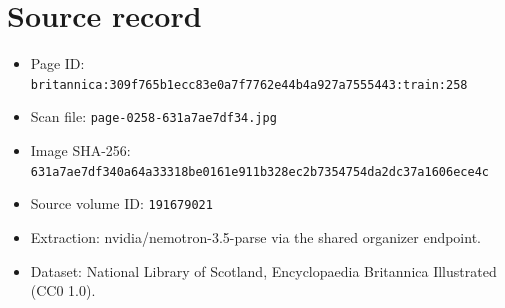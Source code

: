 \documentclass{article}
\begin{document}
\section*{Source record}
\begin{itemize}
\item Page ID: \texttt{britannica:309f765b1ecc83e0a7f7762e44b4a927a7555443:train:258}
\item Scan file: \texttt{page-0258-631a7ae7df34.jpg}
\item Image SHA-256: \texttt{631a7ae7df340a64a33318be0161e911b328ec2b7354754da2dc37a1606ece4c}
\item Source volume ID: \texttt{191679021}
\item Extraction: nvidia/nemotron-3.5-parse via the shared organizer endpoint.
\item Dataset: National Library of Scotland, Encyclopaedia Britannica Illustrated (CC0 1.0).
\end{itemize}
\end{document}
